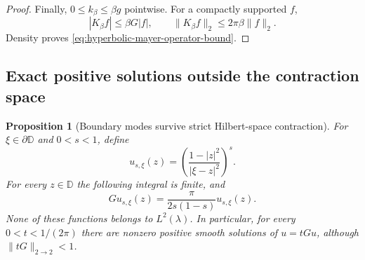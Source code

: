\documentclass[11pt,a4paper]{article}
\numberwithin{equation}{section}
\newtheorem{proposition}[theorem]{Proposition}
\theoremstyle{definition}
\theoremstyle{remark}
\begin{document}
\begin{proof}
Finally, $0\le k_\beta\le\beta g$ pointwise.  For a compactly
supported $f$,
\[
 |K_\beta f|\le\beta G|f|,
 \qquad \|K_\beta f\|_2\le2\pi\beta\|f\|_2.
\]
Density proves \eqref{eq:hyperbolic-mayer-operator-bound}.
\end{proof}

\subsection{Exact positive solutions outside the contraction space}

\begin{proposition}[Boundary modes survive strict Hilbert-space contraction]
\label{prop:hyperbolic-boundary-eigenmodes}
For $\xi\in\partial\mathbb D$ and $0<s<1$, define
\[
 u_{s,\xi}(z)
       =\left(\frac{1-|z|^2}{|\xi-z|^2}\right)^s.
\]
For every $z\in\mathbb D$ the following integral is finite, and
\begin{equation}
 Gu_{s,\xi}(z)=\frac{\pi}{2s(1-s)}u_{s,\xi}(z).
 \label{eq:hyperbolic-positive-boundary-eigenfunction}
\end{equation}
None of these functions belongs to $L^2(\lambda)$.  In particular,
for every $0<t<1/(2\pi)$ there are nonzero positive smooth solutions
of $u=tGu$, although $\|tG\|_{2\to2}<1$.
\end{proposition}
\end{document}
